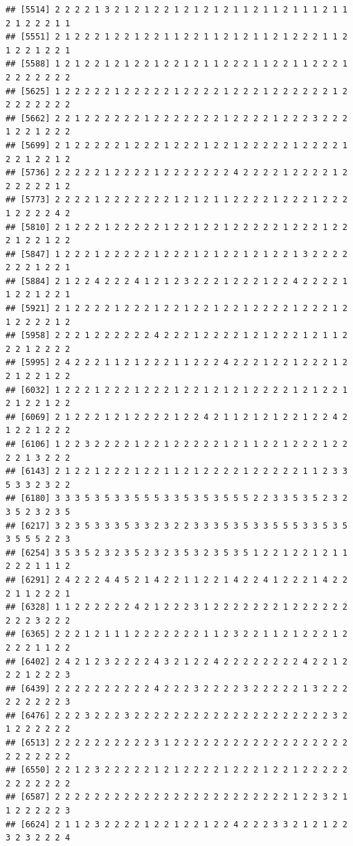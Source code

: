 \documentclass[
]{article}
\begin{document}
\begin{verbatim}
## [5514] 2 2 2 2 1 3 2 1 2 1 2 2 1 2 1 2 1 2 1 1 2 1 1 2 1 1 1 2 1 1 2 1 2 2 2 1 1
## [5551] 2 1 2 2 2 1 2 2 1 2 2 1 1 2 2 1 1 2 1 2 1 1 2 1 2 2 2 1 1 2 1 2 2 1 2 2 1
## [5588] 1 2 1 2 2 1 2 1 2 2 1 2 2 1 2 1 1 2 2 2 1 1 2 2 1 1 2 2 2 1 2 2 2 2 2 2 2
## [5625] 1 2 2 2 2 2 1 2 2 2 2 2 1 2 2 2 2 1 2 2 2 1 2 2 2 2 2 2 1 2 2 2 2 2 2 2 2
## [5662] 2 2 1 2 2 2 2 2 2 1 2 2 2 2 2 2 2 1 2 2 2 2 1 2 2 2 3 2 2 2 1 2 2 1 2 2 2
## [5699] 2 1 2 2 2 2 2 1 2 2 2 1 2 2 2 1 2 2 1 2 2 2 2 2 1 2 2 2 2 1 2 2 1 2 2 1 2
## [5736] 2 2 2 2 2 1 2 2 2 2 1 2 2 2 2 2 2 2 4 2 2 2 2 1 2 2 2 2 1 2 2 2 2 2 2 1 2
## [5773] 2 2 2 2 1 2 2 2 2 2 2 2 1 2 1 2 1 1 2 2 2 2 1 2 2 2 1 2 2 2 1 2 2 2 2 4 2
## [5810] 2 1 2 2 2 1 2 2 2 2 2 1 2 2 1 2 2 1 2 2 2 2 2 1 2 2 2 1 2 2 2 1 2 2 1 2 2
## [5847] 1 2 2 2 1 2 2 2 2 2 1 2 2 2 1 2 1 2 2 1 2 1 2 2 1 3 2 2 2 2 2 2 2 1 2 2 1
## [5884] 2 1 2 2 4 2 2 2 4 1 2 1 2 3 2 2 2 1 2 2 2 1 2 2 4 2 2 2 2 1 1 2 2 1 2 2 1
## [5921] 2 1 2 2 2 2 1 2 2 2 1 2 2 1 2 2 1 2 2 1 2 2 2 2 1 2 2 2 1 2 1 2 2 2 2 1 2
## [5958] 2 2 2 1 2 2 2 2 2 2 4 2 2 2 1 2 2 2 2 1 2 1 2 2 2 1 2 1 1 2 2 2 1 2 2 2 2
## [5995] 2 4 2 2 2 1 1 2 1 2 2 2 1 1 2 2 2 4 2 2 2 1 2 2 1 2 2 2 1 2 2 1 2 2 1 2 2
## [6032] 1 2 2 2 1 2 2 2 1 2 2 2 1 2 2 1 2 1 2 1 2 2 2 2 1 2 1 2 2 1 2 1 2 2 1 2 2
## [6069] 2 1 2 2 2 1 2 1 2 2 2 2 1 2 2 4 2 1 1 2 1 2 1 2 2 1 2 2 4 2 1 2 2 1 2 2 2
## [6106] 1 2 2 3 2 2 2 2 1 2 2 1 2 2 2 2 2 1 2 1 1 2 2 1 2 2 2 1 2 2 2 2 1 3 2 2 2
## [6143] 2 1 2 2 1 2 2 2 1 2 2 1 1 2 1 2 2 2 2 1 2 2 2 2 2 1 1 2 3 3 5 3 3 2 3 2 2
## [6180] 3 3 3 5 3 5 3 3 5 5 5 3 3 5 3 5 3 5 5 5 2 2 3 3 5 3 5 2 3 2 3 5 2 3 2 3 5
## [6217] 3 2 3 5 3 3 3 5 3 3 2 3 2 2 3 3 3 5 3 5 3 3 5 5 5 3 3 5 3 5 3 5 5 5 2 2 3
## [6254] 3 5 3 5 2 3 2 3 5 2 3 2 3 5 3 2 3 5 3 5 1 2 2 1 2 2 1 2 1 1 2 2 2 1 1 1 2
## [6291] 2 4 2 2 2 4 4 5 2 1 4 2 2 1 1 2 2 1 4 2 2 4 1 2 2 2 1 4 2 2 2 1 1 2 2 2 1
## [6328] 1 1 2 2 2 2 2 2 4 2 1 2 2 2 3 1 2 2 2 2 2 2 2 1 2 2 2 2 2 2 2 2 2 3 2 2 2
## [6365] 2 2 2 1 2 1 1 1 2 2 2 2 2 2 2 1 1 2 3 2 2 1 1 2 1 2 2 2 1 2 2 2 2 1 1 2 2
## [6402] 2 4 2 1 2 3 2 2 2 2 4 3 2 1 2 2 4 2 2 2 2 2 2 2 2 4 2 2 1 2 2 2 1 2 2 2 3
## [6439] 2 2 2 2 2 2 2 2 2 2 4 2 2 2 3 2 2 2 2 3 2 2 2 2 2 1 3 2 2 2 2 2 2 2 2 2 3
## [6476] 2 2 2 3 2 2 2 3 2 2 2 2 2 2 2 2 2 2 2 2 2 2 2 2 2 2 2 2 3 2 1 2 2 2 2 2 2
## [6513] 2 2 2 2 2 2 2 2 2 2 3 1 2 2 2 2 2 2 2 2 2 2 2 2 2 2 2 2 2 2 2 2 2 2 2 2 2
## [6550] 2 2 1 2 3 2 2 2 2 2 1 2 1 2 2 2 2 1 2 2 2 1 2 2 1 2 2 2 2 2 2 2 2 2 2 2 2
## [6587] 2 2 2 2 2 2 2 2 2 2 2 2 2 2 2 2 2 2 2 2 2 2 2 2 1 2 2 3 2 1 1 2 2 2 2 2 3
## [6624] 2 1 1 2 3 2 2 2 2 1 2 2 1 2 2 1 2 2 4 2 2 2 3 3 2 1 2 1 2 2 3 2 3 2 2 2 4

\end{verbatim}
\end{document}

